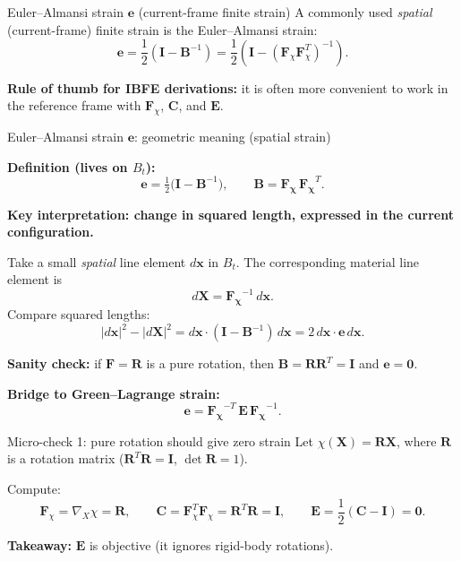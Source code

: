 \documentclass[aspectratio=169]{beamer}
\newcommand{\X}{\bm{X}}
\newcommand{\I}{\bm{I}}
\newcommand{\gradX}{\nabla_{\!X}}
\newcommand{\Cten}{\bm{C}}     %
\newcommand{\Bten}{\bm{B}}     %
\newcommand{\Eten}{\bm{E}}     %
\newcommand{\eten}{\bm{e}}     %
\newcommand{\Fdef}{\bm{F}_{\chi}}  %
\begin{document}
\begin{frame}{Euler--Almansi strain \(\eten\) (current-frame finite strain)}
\small
A commonly used \emph{spatial} (current-frame) finite strain is the Euler--Almansi strain:
\[
\eten = \frac12\left(\I-\Bten^{-1}\right)
      = \frac12\left(\I-(\Fdef\Fdef^T)^{-1}\right).
\]

\medskip
\textbf{Rule of thumb for IBFE derivations:} it is often more convenient to work in the reference frame with \(\Fdef\), \(\Cten\), and \(\Eten\).

\end{frame}

\begin{frame}{Euler--Almansi strain $\bm{e}$: geometric meaning (spatial strain)}
\small

\textbf{Definition (lives on $B_t$):}
\[
\bm{e} = \tfrac12\bigl(\bm{I} - \bm{B}^{-1}\bigr),
\qquad
\bm{B} = \bm{F_\chi}\,\bm{F_\chi}^{T}.
\]

\medskip
\textbf{Key interpretation: change in squared length, expressed in the current configuration.}

Take a small \emph{spatial} line element \(d\bm{x}\) in \(B_t\). The corresponding material line element is
\[
d\bm{X} = \bm{F_\chi}^{-1}\, d\bm{x}.
\]
Compare squared lengths:
\[
|d\bm{x}|^2 - |d\bm{X}|^2
= d\bm{x}\cdot(\bm{I}-\bm{B}^{-1})\,d\bm{x}
= 2\, d\bm{x}\cdot \bm{e}\, d\bm{x}.
\]

\medskip
\textbf{Sanity check:} if \(\bm{F}= \bm{R}\) is a pure rotation, then \(\bm{B}=\bm{R}\bm{R}^T=\bm{I}\) and \(\bm{e}=\bm{0}\).

\medskip
\textbf{Bridge to Green--Lagrange strain:}
\[
\bm{e} = \bm{F_\chi}^{-T}\,\bm{E}\,\bm{F_\chi}^{-1}.
\]
\end{frame}



\begin{frame}{Micro-check 1: pure rotation should give zero strain}
\small
Let \(\chi(\X)=\bm{R}\X\), where \(\bm{R}\) is a rotation matrix (\(\bm{R}^T\bm{R}=\I\), \(\det\bm{R}=1\)).

\medskip
Compute:
\[
\Fdef=\gradX\chi=\bm{R},\qquad
\Cten=\Fdef^T\Fdef=\bm{R}^T\bm{R}=\I,\qquad
\Eten=\frac12(\Cten-\I)=\bm{0}.
\]

\medskip
\textbf{Takeaway:} \(\Eten\) is objective (it ignores rigid-body rotations).

\end{frame}
\end{document}
